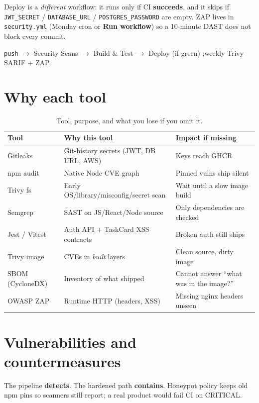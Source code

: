 \documentclass[11pt,a4paper]{article}
\newcommand{\thc}[1]{\textcolor{headtxt}{\textbf{#1}}}
\begin{document}
Deploy is a \emph{different} workflow: it runs only if CI \textbf{succeeds}, and it skips if \texttt{JWT\_SECRET} / \texttt{DATABASE\_URL} / \texttt{POSTGRES\_PASSWORD} are empty.
ZAP lives in \texttt{security.yml} (Monday cron or \textbf{Run workflow}) so a 10-minute DAST does not block every commit.

\noindent\texttt{push} $\rightarrow$ Security Scans $\rightarrow$ Build \& Test $\rightarrow$ Deploy (if green) \qquad;\qquad weekly Trivy SARIF + ZAP.

\section{Why each tool}
\label{sec:tools}

\begin{table}[H]
\centering
\caption{Tool, purpose, and what you lose if you omit it.}
\label{tab:tools}
\begin{tabularx}{\textwidth}{@{}l Y Y@{}}
\toprule
{}\thc{Tool} & \thc{Why this tool} & \thc{Impact if missing} \\
\midrule
Gitleaks & Git-history secrets (JWT, DB URL, AWS) & Keys reach GHCR \\
npm audit & Native Node CVE graph & Pinned vulns ship silent \\
Trivy fs & Early OS/library/misconfig/secret scan & Wait until a slow image build \\
Semgrep & SAST on JS/React/Node source & Only dependencies are checked \\
Jest / Vitest & Auth API + TaskCard XSS contracts & Broken auth still ships \\
Trivy image & CVEs in \emph{built} layers & Clean source, dirty image \\
SBOM (CycloneDX) & Inventory of what shipped & Cannot answer ``what was in the image?'' \\
OWASP ZAP & Runtime HTTP (headers, XSS) & Missing nginx headers unseen \\
\bottomrule
\end{tabularx}
\end{table}

\section{Vulnerabilities and countermeasures}
\label{sec:vuln}
The pipeline \textbf{detects}. The hardened path \textbf{contains}. Honeypot policy keeps old npm pins so scanners still report; a real product would fail CI on CRITICAL.
\end{document}
